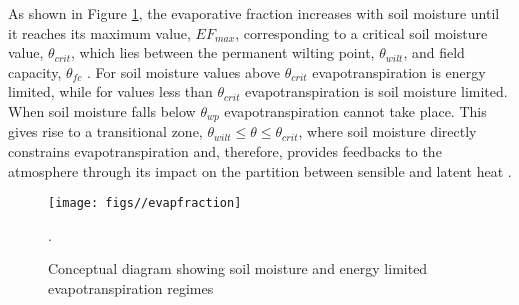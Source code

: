 \documentclass{icldt}\usepackage[]{graphicx}\usepackage[]{color}
\begin{document}
\noindent As shown in Figure \ref{fig:evapfraction}, the evaporative fraction increases with soil moisture until it reaches its maximum value, $ EF_{max} $, corresponding to a critical soil moisture value, $ \theta_{crit} $, which lies between the permanent wilting point, $ \theta_{wilt} $, and field capacity, $ \theta_{fc} $ \citep{Seneviratne2010}. For soil moisture values above $ \theta_{crit} $ evapotranspiration is energy limited, while for values less than $ \theta_{crit} $ evapotranspiration is soil moisture limited. When soil moisture falls below $ \theta_{wp} $ evapotranspiration cannot take place. This gives rise to a transitional zone, $ \theta_{wilt} \leq \theta \leq \theta_{crit} $, where soil moisture directly constrains evapotranspiration and, therefore, provides feedbacks to the atmosphere through its impact on the partition between sensible and latent heat \citep{Pitman2003,Seneviratne2010}. \\

\begin{figure}[h]
    \centering
    \texttt{[image: figs//evapfraction]}
    \caption[Conceptual diagram of different evapotranspiration regimes]{Conceptual diagram showing soil moisture and energy limited evapotranspiration regimes \citep{Seneviratne2010}}.
    \label{fig:evapfraction}
\end{figure}
\end{document}
